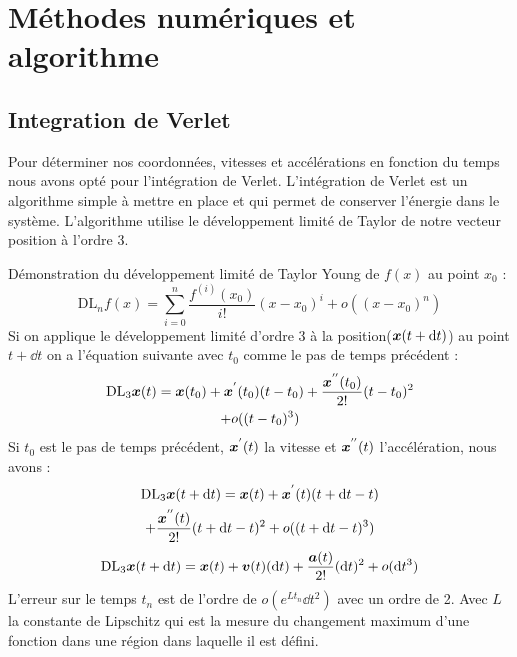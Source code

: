 \section{Méthodes numériques et algorithme}
    \subsection{Integration de Verlet}
        Pour déterminer nos coordonnées, vitesses et accélérations en fonction du temps nous avons opté pour l'intégration de Verlet. L'intégration de Verlet est un algorithme simple à mettre en place et qui permet de conserver l'énergie dans le système. L'algorithme utilise le développement limité de Taylor de notre vecteur position à l'ordre 3.

        Démonstration du développement limité de Taylor Young de $f(x)$ au point $x_0$\cite{agarwal_introduction_2011} :%
        \begin{equation}
            \mathrm{DL}_n f(x) = \sum_{i=0}^{n}\frac{f^{(i)}(x_0)}{i!}(x-x_0)^i+ o((x-x_0)^n)
        \end{equation}
        Si on applique le développement limité d'ordre 3 à la position($\vb*{x}(t+\mathrm{d}t)$) au point $t+\dd t$ on a l'équation suivante avec $t_0$ comme le pas de temps précédent :
        \begin{multline}
            \mathrm{DL}_3 \vb*{x}(t) = \vb*{x}(t_0)+\vb*{x}^{'}(t_0)(t-t_0)+\frac{\vb*{x}^{''}(t_0)}{2!}(t-t_0)^2 \\+o((t-t_0)^3)
        \end{multline}
        Si $t_0$ est le pas de temps précédent, $\vb*{x}^{'}(t)$ la vitesse et $\vb*{x}^{''}(t)$ l'accélération, nous avons :
        \begin{multline}
            \mathrm{DL}_3 \vb*{x}(t+\mathrm{d}t) = \vb*{x}(t)+\vb*{x}^{'}(t)(t+\mathrm{d}t-t)
            \\+\frac{\vb*{x}^{''}(t)}{2!}(t+\mathrm{d}t-t)^2+o((t+\mathrm{d}t-t)^3)
            \label{eq:posx}
        \end{multline}
        \begin{equation}
             \mathrm{DL}_3 \vb*{x}(t+\mathrm{d}t)= \vb*{x}(t)+\vb*{v}(t)(\mathrm{d}t)+\frac{\vb*{a}(t)}{2!}(\mathrm{d}t)^2
             \\+o(\mathrm{d}t^3)
        \end{equation}
        L'erreur sur le temps $t_n$ est de l'ordre de $o(e^{Lt_n}\dd t^2)$ avec un ordre de 2\cite{crivelli_stormer-verlet_2008}. Avec $L$ la constante de Lipschitz qui est la mesure du changement maximum d'une fonction dans une région dans laquelle il est défini.

